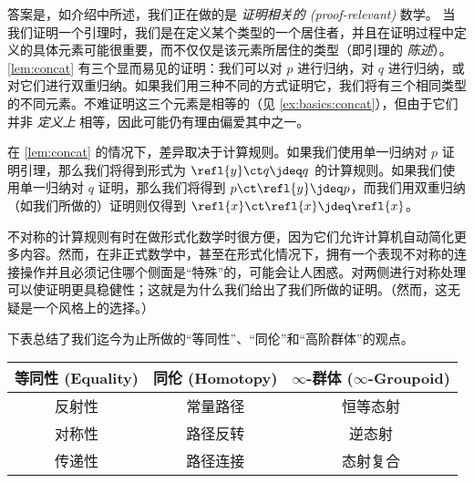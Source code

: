 答案是，如介绍中所述，我们正在做的是 \emph{证明相关的 (proof-relevant)} 数学。
%
当我们证明一个引理时，我们是在定义某个类型的一个居住者，并且在证明过程中定义的具体元素可能很重要，而不仅仅是该元素所居住的类型（即引理的 \emph{陈述}）。\cref{lem:concat} 有三个显而易见的证明：我们可以对 $p$ 进行归纳，对 $q$ 进行归纳，或对它们进行双重归纳。如果我们用三种不同的方式证明它，我们将有三个相同类型的不同元素。不难证明这三个元素是相等的（见 \cref{ex:basics:concat}），但由于它们并非 \emph{定义上} 相等，因此可能仍有理由偏爱其中之一。

在 \cref{lem:concat} 的情况下，差异取决于计算规则。如果我们使用单一归纳对 $p$ 证明引理，那么我们将得到形式为 $\refl{y} \ct q \jdeq q$ 的计算规则。如果我们使用单一归纳对 $q$ 证明，那么我们将得到 $p\ct\refl{y}\jdeq p$，而我们用双重归纳（如我们所做的）证明则仅得到 $\refl{x}\ct\refl{x} \jdeq \refl{x}$。

%
不对称的计算规则有时在做形式化数学时很方便，因为它们允许计算机自动简化更多内容。然而，在非正式数学中，甚至在形式化情况下，拥有一个表现不对称的连接操作并且必须记住哪个侧面是“特殊”的，可能会让人困惑。对两侧进行对称处理可以使证明更具稳健性；这就是为什么我们给出了我们所做的证明。（然而，这无疑是一个风格上的选择。）

下表总结了我们迄今为止所做的“等同性”、“同伦”和“高阶群体”的观点。
\begin{center}
  \medskip
  \begin{tabular}{ccc}
    \toprule
    等同性 (Equality) & 同伦 (Homotopy) & $\infty$-群体 ($\infty$-Groupoid)\\
    \midrule
    反射性\index{等同性!反射性 (equality!reflexivity of)} & 常量路径 & 恒等态射\\
    对称性\index{等同性!对称性 (equality!symmetry of)} & 路径反转 & 逆态射\\
    传递性\index{等同性!传递性 (equality!transitivity of)} & 路径连接 & 态射复合\\
    \bottomrule
  \end{tabular}
  \medskip
\end{center}

